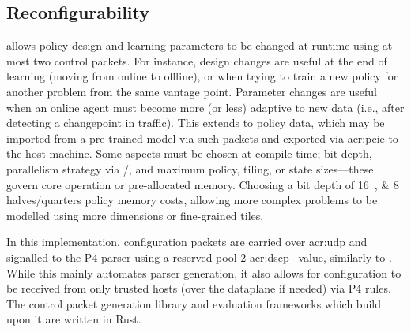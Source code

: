 
\subsection{Reconfigurability}\label{sec:reconfigurability}
\approachshort{} allows policy design and learning parameters to be changed at runtime using at most two control packets.
For instance, design changes are useful at the end of learning (moving from online to offline), or when trying to train a new policy for another problem from the same vantage point.
Parameter changes are useful when an online agent must become more (or less) adaptive to new data (i.e., after detecting a changepoint in traffic).
This extends to policy data, which may be imported from a pre-trained model via such packets and exported via \gls{acr:pcie} to the host machine.
Some aspects must be chosen at compile time; bit depth, parallelism strategy via \Coopfw/\Indfw, and maximum policy, tiling, or state sizes---these govern core operation or pre-allocated memory.
Choosing a bit depth of \qtylist[list-pair-separator = { or }]{16;8}{\bit} halves/quarters policy memory costs, allowing more complex problems to be modelled using more dimensions or fine-grained tiles.

In this implementation, configuration packets are carried over \gls{acr:udp} and signalled to the P4 parser using a reserved pool 2 \gls{acr:dscp}~\parencite{rfc2474} value, similarly to \textcite{DBLP:conf/isca/LiLYCSH19}.
While this mainly automates parser generation, it also allows for configuration to be received from only trusted hosts (over the dataplane if needed) via P4 rules.
The control packet generation library and evaluation frameworks which build upon it are written in Rust.


